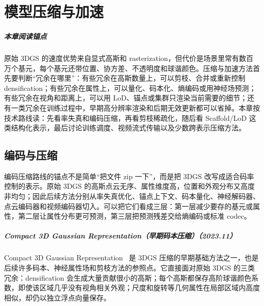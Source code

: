 \chapter{模型压缩与加速}

\paragraph*{本章阅读锚点}
原始 3DGS 的速度优势来自显式高斯和 rasterization，但代价是场景里常有数百万个基元，每个基元还带位置、协方差、不透明度和球谐颜色。压缩与加速方法首先要判断“冗余在哪里”：有些冗余在高斯数量上，可以剪枝、合并或重新控制 densification；有些冗余在属性上，可以量化、码本化、熵编码或用神经场预测；有些冗余在视角和距离上，可以用 LoD、锚点或集群只渲染当前需要的细节；还有一类冗余在训练过程中，早期高分辨率渲染和后期无效更新都可以省掉。本章按技术路线读：先看率失真和编码压缩，再看剪枝稀疏化，随后看 Scaffold/LoD 这类结构化表示，最后讨论训练调度、视频流式传输以及少数跨表示压缩方法。

\section{编码与压缩}

编码压缩路线的锚点不是简单“把文件 zip 一下”，而是把 3DGS 改写成适合码率控制的表示。原始 3DGS 的高斯点云无序、属性维度高，位置和外观分布又高度非均匀；因此后续方法分别从率失真优化、锚点上下文、码本量化、神经解码器、点云编码器和视频编码器切入。可以把它们看成三层：第一层减少要存的基元或属性，第二层让属性分布更可预测，第三层把预测残差交给熵编码或标准 codec。



\paragraph{Compact 3D Gaussian Representation（早期码本压缩）（2023.11）}
Compact 3D Gaussian Representation~\cite{2311_13681} 是 3DGS 压缩的早期基础方法之一，也是后续许多码本、神经属性场和剪枝方法的参照点。它直接面对原始 3DGS 的三类冗余：densification 会生成大量贡献很小的高斯；每个高斯都保存高阶球谐颜色系数，即使该区域几乎没有视角相关外观；尺度和旋转等几何属性在局部区域内高度相似，却仍以独立浮点向量保存。

